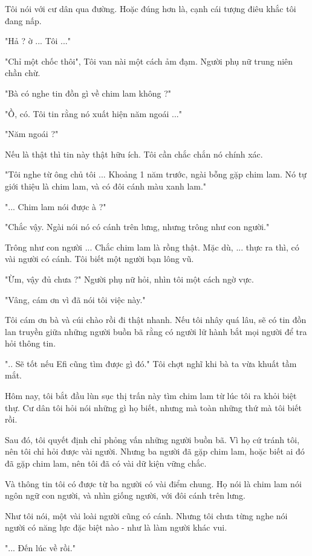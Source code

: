  Tôi nói với cư dân qua đường. Hoặc đúng hơn là, cạnh cái tượng điêu khắc tôi đang nấp.
 
 "Hả ? ờ ... Tôi ..."
 
 "Chỉ một chốc thôi", Tôi van nài một cách ảm đạm. Người phụ nữ trung niên chần chừ.
 
 "Bà có nghe tin đồn gì về chim lam không ?"
 
 "Ồ, có. Tôi tin rằng nó xuất hiện năm ngoái ..."
 
 "Năm ngoái ?"
 
 Nếu là thật thì tin này thật hữu ích. Tôi cần chắc chắn nó chính xác.
 
 "Tôi nghe từ ông chủ tôi ... Khoảng 1 năm trước, ngài bỗng gặp chim lam. Nó tự giới thiệu là chim lam, và có đôi cánh màu xanh lam."
 
 "... Chim lam nói được à ?"
 
 "Chắc vậy. Ngài nói nó có cánh trên lưng, nhưng trông như con người."
 
 Trông như con người ... Chắc chim lam là rồng thật. Mặc dù, ... thực ra thì, có vài người có cánh. Tôi biết một người bạn lông vũ.
 
 "Ừm, vậy đủ chưa ?" Người phụ nữ hỏi, nhìn tôi một cách ngờ vực.
 
 "Vâng, cám ơn vì đã nói tôi việc này."
 
 Tôi cám ơn bà và cúi chào rồi đi thật nhanh. Nếu tôi nhây quá lâu, sẽ có tin đồn lan truyền giữa những người buồn bã rằng có người lữ hành bắt mọi người để tra hỏi thông tin.
 
 ".. Sẽ tốt nếu Efi cũng tìm được gì đó." Tôi chợt nghĩ khi bà ta vừa khuất tầm mắt.
 
Hôm nay, tôi bắt đầu lùn sục thị trấn này tìm chim lam từ lúc tôi ra khỏi biệt thự. Cư dân tôi hỏi nói những gì họ biết, nhưng mà toàn những thứ mà tôi biết rồi. 

Sau đó, tôi quyết định chỉ phỏng vấn những người buồn bã. Vì họ cứ tránh tôi, nên tôi chỉ hỏi được vài người. Nhưng ba người đã gặp chim lam, hoặc biết ai đó đã gặp chim lam, nên tôi đã có vài dữ kiện vững chắc.

Và thông tin tôi có được từ ba người có vài điểm chung. Họ nói là chim lam nói ngôn ngữ con người, và nhìn giống người, với đôi cánh trên lưng.

Như tôi nói, một vài loài người cũng có cánh. Nhưng tôi chưa từng nghe nói người có năng lực đặc biệt nào - như là làm người khác vui.

"... Đến lúc về rồi."

